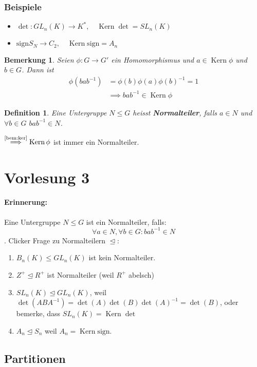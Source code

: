 \documentclass{article}
\theoremstyle{plain}
\newtheorem{definition}{Definition}
\newtheorem{bemerkung}{Bemerkung}
\renewcommand{\ker}{\mathop{\text{Kern}}}
\newcommand{\defn}[1]{\textbf{#1}}
\newcommand{\ug}{\leq}
\newcommand{\normal}{\trianglelefteq}
\newcommand{\sgn}{\mathrm{sign}}
\begin{document}
\subsubsection*{Beispiele}
\begin{itemize}
    \item $\det\colon GL_n(K)\to K^*,\quad \ker\det=SL_n(K)$
    \item $\sgn S_N\to C_2,\quad \ker\sgn=A_n$
\end{itemize}
\begin{bemerkung}\label{bem:ker}
    Seien $\phi\colon G\to G'$ ein Homomorphismus und $a\in \ker\phi$ und $b\in G$. 
    Dann ist 
    \begin{align*}
        \phi(bab^{-1})&=\phi(b)\phi(a)\phi(b)^{-1}=1\\
        &\implies bab^{-1}\in\ker\phi
    \end{align*}
\end{bemerkung}
\begin{definition}
    Eine Untergruppe $N\leq G$ heisst \defn{Normalteiler}, falls $a\in N$ und $\forall b\in G$ $bab^{-1}\in N$.
\end{definition}
$\overset{\text{\cref{bem:ker}}}{\implies}\ker\phi$ ist immer ein Normalteiler.

\section*{Vorlesung 3}
\paragraph{Erinnerung:}
Eine Untergruppe $N\ug G$ ist ein Normalteiler, falls:
$$\forall a\in N, \forall b \in G: bab^{-1}\in N $$.
Clicker Frage zu Normalteilern $\normal$:
\begin{enumerate}
    \item $B_n(K) \ug GL_n(K)$ ist kein Normalteiler.
    \item $Z^+ \normal R^+$ ist Normalteiler (weil $R^+$ abelsch)
    \item $SL_n(K) \normal GL_n(K)$, weil $\det(ABA^{-1}) = \det(A)\det(B)\det(A)^{-1}=\det(B)$, oder bemerke, dass $SL_n(K)=\ker \det$
    \item $A_n\normal S_n$ weil $A_n=\ker\sgn$.
\end{enumerate}

\subsection*{Partitionen}
\end{document}
